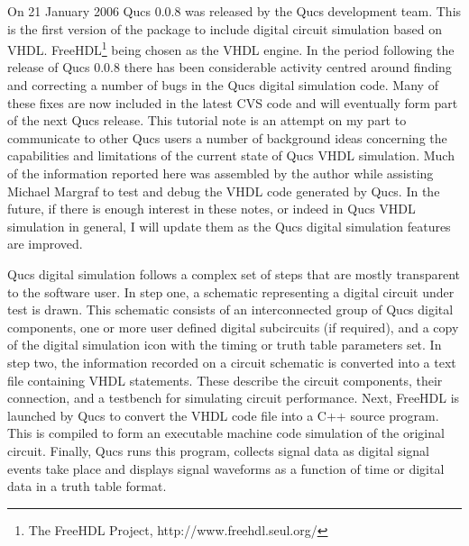%
%
%
%

\renewcommand{\thesubfigure}{\thefigure(\alph{subfigure})}
\makeatletter
  \renewcommand{\@thesubfigure}{\thesubfigure:\space}
  \renewcommand{\p@subfigure}{}
\makeatother

\renewcommand{\thesubtable}{\thetable(\alph{subtable})}
\makeatletter
  \renewcommand{\@thesubtable}{\thesubtable:\space}
  \renewcommand{\p@subtable}{}
\makeatother


On 21 January 2006 Qucs 0.0.8 was released by the Qucs development
team.  This is the first version of the package to include digital
circuit simulation based on VHDL.  FreeHDL\footnote{The FreeHDL
Project, http://www.freehdl.seul.org/} being chosen as the VHDL
engine.  In the period following the release of Qucs 0.0.8 there has
been considerable activity centred around finding and correcting a
number of bugs in the Qucs digital simulation code.  Many of these
fixes are now included in the latest CVS code and will eventually form
part of the next Qucs release.  This tutorial note is an attempt on my
part to communicate to other Qucs users a number of background ideas
concerning the capabilities and limitations of the current state of
Qucs VHDL simulation.  Much of the information reported here was
assembled by the author while assisting Michael Margraf to test and
debug the VHDL code generated by Qucs.  In the future, if there is
enough interest in these notes, or indeed in Qucs VHDL simulation in
general, I will update them as the Qucs digital simulation features
are improved.

\addvspace{12pt}

Qucs digital simulation follows a complex set of steps that are mostly
transparent to the software user.  In step one, a schematic
representing a digital circuit under test is drawn.  This schematic
consists of an interconnected group of Qucs digital components, one or
more user defined digital subcircuits (if required), and a copy of the
digital simulation icon with the timing or truth table parameters set.
In step two, the information recorded on a circuit schematic is
converted into a text file containing VHDL statements. These describe
the circuit components, their connection, and a testbench for
simulating circuit performance.  Next, FreeHDL is launched by Qucs to
convert the VHDL code file into a C++ source program.  This is
compiled to form an executable machine code simulation of the original
circuit.  Finally, Qucs runs this program, collects signal data as
digital signal events take place and displays signal waveforms as a
function of time or digital data in a truth table format.

